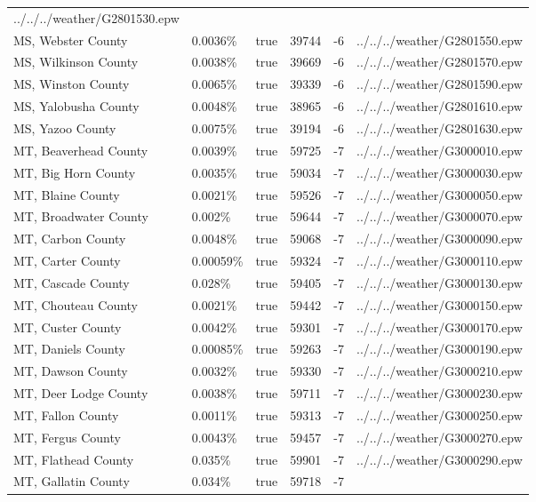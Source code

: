 \begin{longtable}[]{@{}llllll@{}}
../../../weather/G2801530.epw \\
MS, Webster County & 0.0036\% & true & 39744 & -6 &
../../../weather/G2801550.epw \\
MS, Wilkinson County & 0.0038\% & true & 39669 & -6 &
../../../weather/G2801570.epw \\
MS, Winston County & 0.0065\% & true & 39339 & -6 &
../../../weather/G2801590.epw \\
MS, Yalobusha County & 0.0048\% & true & 38965 & -6 &
../../../weather/G2801610.epw \\
MS, Yazoo County & 0.0075\% & true & 39194 & -6 &
../../../weather/G2801630.epw \\
MT, Beaverhead County & 0.0039\% & true & 59725 & -7 &
../../../weather/G3000010.epw \\
MT, Big Horn County & 0.0035\% & true & 59034 & -7 &
../../../weather/G3000030.epw \\
MT, Blaine County & 0.0021\% & true & 59526 & -7 &
../../../weather/G3000050.epw \\
MT, Broadwater County & 0.002\% & true & 59644 & -7 &
../../../weather/G3000070.epw \\
MT, Carbon County & 0.0048\% & true & 59068 & -7 &
../../../weather/G3000090.epw \\
MT, Carter County & 0.00059\% & true & 59324 & -7 &
../../../weather/G3000110.epw \\
MT, Cascade County & 0.028\% & true & 59405 & -7 &
../../../weather/G3000130.epw \\
MT, Chouteau County & 0.0021\% & true & 59442 & -7 &
../../../weather/G3000150.epw \\
MT, Custer County & 0.0042\% & true & 59301 & -7 &
../../../weather/G3000170.epw \\
MT, Daniels County & 0.00085\% & true & 59263 & -7 &
../../../weather/G3000190.epw \\
MT, Dawson County & 0.0032\% & true & 59330 & -7 &
../../../weather/G3000210.epw \\
MT, Deer Lodge County & 0.0038\% & true & 59711 & -7 &
../../../weather/G3000230.epw \\
MT, Fallon County & 0.0011\% & true & 59313 & -7 &
../../../weather/G3000250.epw \\
MT, Fergus County & 0.0043\% & true & 59457 & -7 &
../../../weather/G3000270.epw \\
MT, Flathead County & 0.035\% & true & 59901 & -7 &
../../../weather/G3000290.epw \\
MT, Gallatin County & 0.034\% & true & 59718 & -7 &

\end{longtable}
